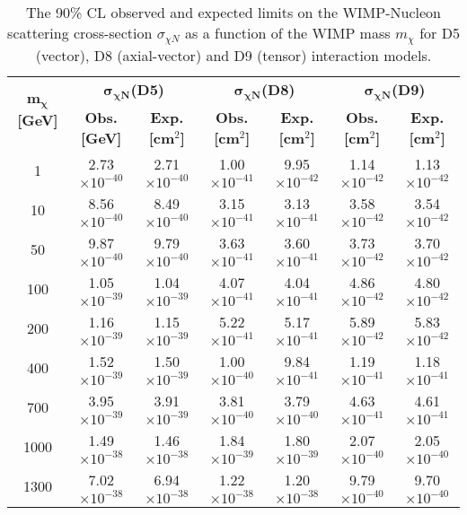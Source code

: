 \begin{sidewaystable}[h!]
   \centering
\begin{tabular}{c|cc|cc|cc}
\hline\hline
\multirow{2}{*}{{\bf $\mathbf{m_\chi}$ [GeV]}} & \multicolumn{2}{c|}{{\bf $\mathbf{\sigma_{\chi N}}$(D5)}} & \multicolumn{2}{c|}{{\bf $\mathbf{\sigma_{\chi N}}$(D8)}} & \multicolumn{2}{c}{{\bf $\mathbf{\sigma_{\chi N}}$(D9)}}\\ 
\cline{2-7}
       & {\bf Obs. [GeV]} & {\bf Exp. [cm$^2$]} & {\bf Obs. [cm$^2$]} & {\bf Exp. [cm$^2$]} & {\bf Obs. [cm$^2$]} & {\bf Exp. [cm$^2$]}\\ 
\hline
1	   &	2.73$\times 10^{-40}$	&	2.71$\times 10^{-40}$	&	1.00$\times 10^{-41}$	&	9.95$\times 10^{-42}$	&	1.14$\times 10^{-42}$	&	1.13$\times 10^{-42}$	\\
10	   &	8.56$\times 10^{-40}$	&	8.49$\times 10^{-40}$	&	3.15$\times 10^{-41}$	&	3.13$\times 10^{-41}$	&	3.58$\times 10^{-42}$	&	3.54$\times 10^{-42}$	\\
50	   &	9.87$\times 10^{-40}$	&	9.79$\times 10^{-40}$	&	3.63$\times 10^{-41}$	&	3.60$\times 10^{-41}$	&	3.73$\times 10^{-42}$	&	3.70$\times 10^{-42}$	\\
100	&	1.05$\times 10^{-39}$	&	1.04$\times 10^{-39}$	&	4.07$\times 10^{-41}$	&	4.04$\times 10^{-41}$	&	4.86$\times 10^{-42}$	&	4.80$\times 10^{-42}$	\\
200	&	1.16$\times 10^{-39}$	&	1.15$\times 10^{-39}$	&	5.22$\times 10^{-41}$	&	5.17$\times 10^{-41}$	&	5.89$\times 10^{-42}$	&	5.83$\times 10^{-42}$	\\
400	&	1.52$\times 10^{-39}$	&	1.50$\times 10^{-39}$	&	1.00$\times 10^{-40}$	&	9.84$\times 10^{-41}$	&	1.19$\times 10^{-41}$	&	1.18$\times 10^{-41}$	\\
700	&	3.95$\times 10^{-39}$	&	3.91$\times 10^{-39}$	&	3.81$\times 10^{-40}$	&	3.79$\times 10^{-40}$	&	4.63$\times 10^{-41}$	&	4.61$\times 10^{-41}$	\\
1000	&	1.49$\times 10^{-38}$	&	1.46$\times 10^{-38}$	&	1.84$\times 10^{-39}$	&	1.80$\times 10^{-39}$	&	2.07$\times 10^{-40}$	&	2.05$\times 10^{-40}$	\\
1300	&	7.02$\times 10^{-38}$	&	6.94$\times 10^{-38}$	&	1.22$\times 10^{-38}$ 	&	1.20$\times 10^{-38}$ 	&	9.79$\times 10^{-40}$	&	9.70$\times 10^{-40}$ 	\\
\hline\hline
\end{tabular}
\caption[The 90\% CL observed and expected limits on the WIMP-Nucleon scattering cross-section $\sigma_{\chi N}$ as a function of the WIMP mass $m_\chi$ for different interaction models.]{The 90\% CL observed and expected limits on the WIMP-Nucleon scattering cross-section $\sigma_{\chi N}$ as a function of the WIMP mass $m_\chi$ for D5 (vector), D8 (axial-vector) and D9 (tensor) interaction models.}
\label{tab:WIMPsEffective_limit_sigma}
\end{sidewaystable}

